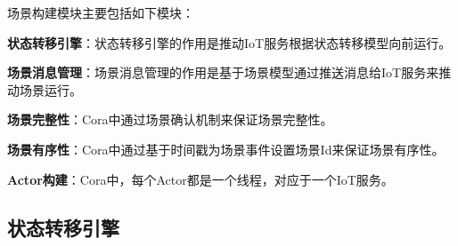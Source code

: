 \documentclass[winfonts,master,twoside]{njuthesis}
\begin{document}
场景构建模块主要包括如下模块：

\textbf{状态转移引擎}：状态转移引擎的作用是推动IoT服务根据状态转移模型向前运行。

\textbf{场景消息管理}：场景消息管理的作用是基于场景模型通过推送消息给IoT服务来推动场景运行。

\textbf{场景完整性}：Cora中通过场景确认机制来保证场景完整性。

\textbf{场景有序性}：Cora中通过基于时间戳为场景事件设置场景Id来保证场景有序性。

\textbf{Actor构建}：Cora中，每个Actor都是一个线程，对应于一个IoT服务。

\subsection{状态转移引擎}
\end{document}
